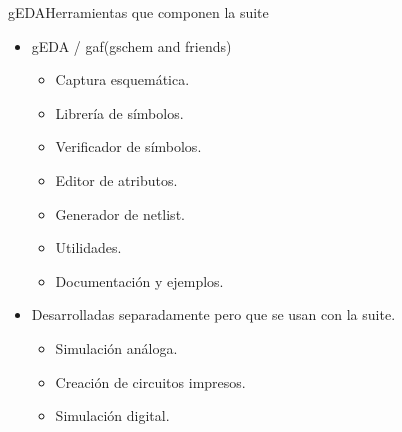 \documentclass{beamer}
\begin{document}
\begin{frame}{gEDA}{Herramientas que componen la suite}
  \begin{itemize}
  \item gEDA / gaf(gschem and friends)
      \begin{itemize}
      \item Captura esquemática.
      \item Librería de símbolos.
      \item Verificador de símbolos.
      \item Editor de atributos.
      \item Generador de netlist.
      \item Utilidades.
      \item Documentación y ejemplos.
      \end{itemize}
    \item Desarrolladas separadamente pero que se usan con la suite.
      \begin{itemize}
      \item Simulación análoga.
      \item Creación de circuitos impresos.
      \item Simulación digital.
      \end{itemize}
  \end{itemize}
\end{frame}



\end{document}

